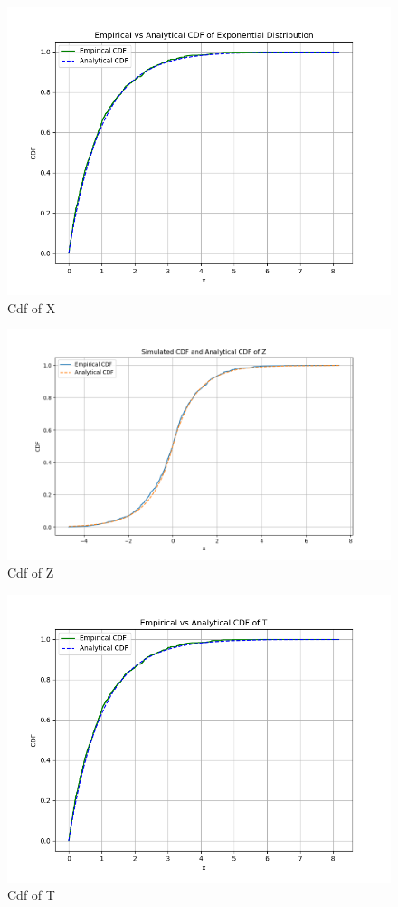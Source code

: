 \documentclass[journal,12pt,twocolumn]{IEEEtran}
\begin{document}
\begin{figure}[ht]
\includegraphics[width=\columnwidth]{2023/ST/61/figs/Figure_11.png}
\caption{Cdf of X}
\label{fig:2023/ST/61/4}
\end{figure}
\begin{figure}[ht]
\includegraphics[width=\columnwidth]{2023/ST/61/figs/Figure_12.png}
\caption{Cdf of Z}
\label{fig:2023/ST/61/5}
\end{figure}
\begin{figure}[ht]
\includegraphics[width=\columnwidth]{2023/ST/61/figs/Figure_13.png}
\caption{Cdf of T}
\label{fig:2023/ST/61/6}
\end{figure}
\end{document}
